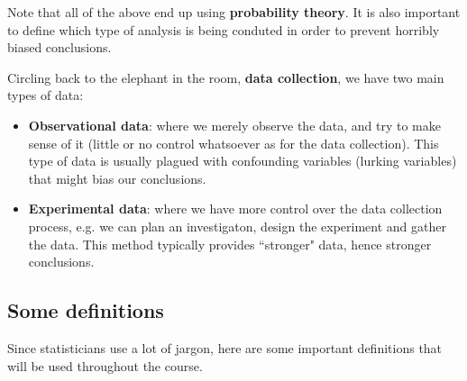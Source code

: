  \vspace{0.2cm}

 \begin{remark}
 Note that all of the above end up using \textbf{probability theory}. It is also important to define which type of analysis is being conduted in order to prevent horribly biased conclusions.
 \end{remark}

 Circling back to the elephant in the room, \textbf{data collection}, we have two main types of data:

 \begin{itemize}
   \item \textbf{Observational data}: where we merely observe the data, and try to make sense of it (little or no control whatsoever as for the data collection). This type of data is usually plagued with confounding variables (lurking variables) that might bias our conclusions.
   \item \textbf{Experimental data}: where we have more control over the data collection process, e.g. we can plan an investigaton, design the experiment and gather the data. This method typically provides ``stronger" data, hence
   stronger conclusions.  
 \end{itemize}

 \subsection{Some definitions}
Since statisticians use a lot of jargon, here are some important definitions that will be used throughout the course.

